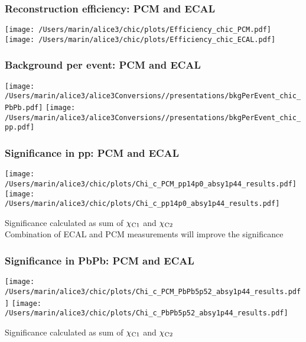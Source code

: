 \documentclass[final,hyperref={pdfpagelabels=false},aspectratio=169,t]{beamer}
\begin{document}
\begin{frame}
\frametitle{Reconstruction efficiency: PCM and ECAL} 
\texttt{[image: /Users/marin/alice3/chic/plots/Efficiency\_chic\_PCM.pdf]}
\texttt{[image: /Users/marin/alice3/chic/plots/Efficiency\_chic\_ECAL.pdf]}

\end{frame}


\begin{frame}
\frametitle{Background per event: PCM and ECAL} 

\texttt{[image: /Users/marin/alice3/alice3Conversions//presentations/bkgPerEvent\_chic\_PbPb.pdf]}
\texttt{[image: /Users/marin/alice3/alice3Conversions//presentations/bkgPerEvent\_chic\_pp.pdf]}
\end{frame}


\begin{frame}
\frametitle{Significance in pp: PCM and ECAL} 
\texttt{[image: /Users/marin/alice3/chic/plots/Chi\_c\_PCM\_pp14p0\_absy1p44\_results.pdf]}
\texttt{[image: /Users/marin/alice3/chic/plots/Chi\_c\_pp14p0\_absy1p44\_results.pdf]}

Significance calculated as sum of $\chi_{\rm C1}$ and $\chi_{\rm C2}$\\
Combination of ECAL and PCM measurements will improve the significance

\end{frame}

\begin{frame}
\frametitle{Significance in PbPb: PCM and ECAL} 
\texttt{[image: /Users/marin/alice3/chic/plots/Chi\_c\_PCM\_PbPb5p52\_absy1p44\_results.pdf]}
\texttt{[image: /Users/marin/alice3/chic/plots/Chi\_c\_PbPb5p52\_absy1p44\_results.pdf]}

Significance calculated as sum of $\chi_{\rm C1}$ and $\chi_{\rm C2}$\\
\end{frame}
\end{document}
